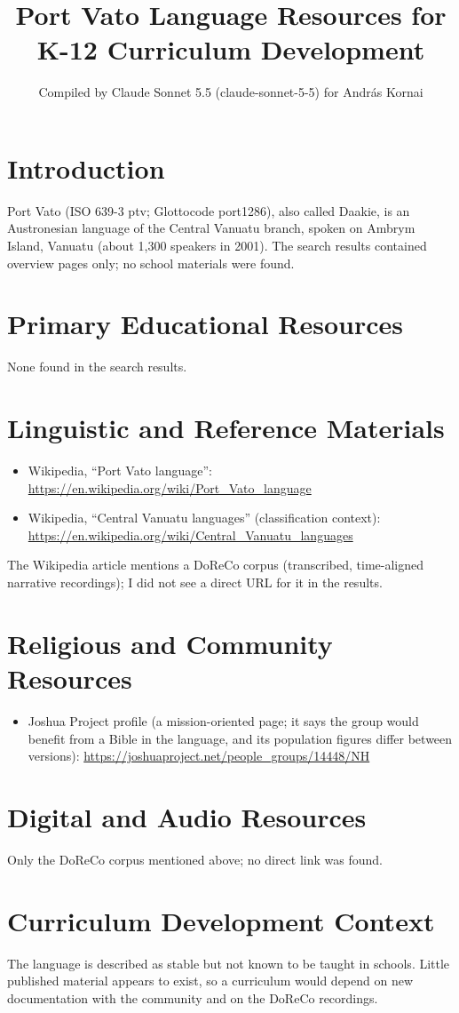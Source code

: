 \documentclass[12pt]{article}
\title{Port Vato Language Resources for K-12 Curriculum Development}
\author{Compiled by Claude Sonnet 5.5 (claude-sonnet-5-5) for Andr\'as Kornai}
\date{}
\begin{document}
\maketitle

\section{Introduction}
Port Vato (ISO 639-3 ptv; Glottocode port1286), also called Daakie, is an Austronesian language of the Central Vanuatu branch, spoken on Ambrym Island, Vanuatu (about 1,300 speakers in 2001). The search results contained overview pages only; no school materials were found.

\section{Primary Educational Resources}
None found in the search results.

\section{Linguistic and Reference Materials}
\begin{itemize}
\item Wikipedia, ``Port Vato language'': \url{https://en.wikipedia.org/wiki/Port_Vato_language}
\item Wikipedia, ``Central Vanuatu languages'' (classification context): \url{https://en.wikipedia.org/wiki/Central_Vanuatu_languages}
\end{itemize}
The Wikipedia article mentions a DoReCo corpus (transcribed, time-aligned narrative recordings); I did not see a direct URL for it in the results.

\section{Religious and Community Resources}
\begin{itemize}
\item Joshua Project profile (a mission-oriented page; it says the group would benefit from a Bible in the language, and its population figures differ between versions): \url{https://joshuaproject.net/people_groups/14448/NH}
\end{itemize}

\section{Digital and Audio Resources}
Only the DoReCo corpus mentioned above; no direct link was found.

\section{Curriculum Development Context}
The language is described as stable but not known to be taught in schools. Little published material appears to exist, so a curriculum would depend on new documentation with the community and on the DoReCo recordings.
\end{document}
